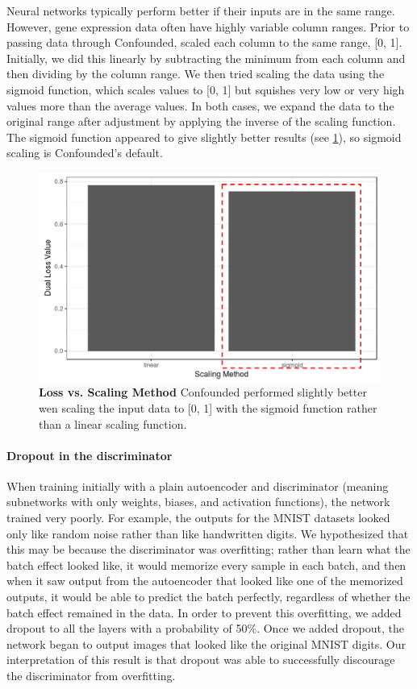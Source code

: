 \documentclass{article}
\begin{document}
Neural networks typically perform better if their inputs are in the same range. %
However, gene expression data often have highly variable column ranges. %
Prior to passing data through Confounded, scaled each column to the same range, [0, 1].
Initially, we did this linearly by subtracting the minimum from each column and then dividing by the column range.
We then tried scaling the data using the sigmoid function, which scales values to [0, 1] but squishes very low or very high values more than the average values.
In both cases, we expand the data to the original range after adjustment by applying the inverse of the scaling function.
The sigmoid function appeared to give slightly better results (see \figurename{} \ref{fig:scaling}), so sigmoid scaling is Confounded's default.

\begin{figure}
	\centering
	\includegraphics[width=\columnwidth]{figures/supplement/scaling.png}
	\caption{\textbf{Loss vs. Scaling Method}
	Confounded performed slightly better wen scaling the input data to [0, 1] with the sigmoid function rather than a linear scaling function.
	}
	\label{fig:scaling}
\end{figure}

\paragraph{Dropout in the discriminator}

When training initially with a plain autoencoder and discriminator (meaning subnetworks with only weights, biases, and activation functions), the network trained very poorly.
For example, the outputs for the MNIST datasets looked only like random noise rather than like handwritten digits.
We hypothesized that this may be because the discriminator was overfitting;
rather than learn what the batch effect looked like, it would memorize every sample in each batch, and then when it saw output from the autoencoder that looked like one of the memorized outputs, it would be able to predict the batch perfectly, regardless of whether the batch effect remained in the data.
In order to prevent this overfitting, we added dropout to all the layers with a probability of 50\%.
Once we added dropout, the network began to output images that looked like the original MNIST digits.
Our interpretation of this result is that dropout was able to successfully discourage the discriminator from overfitting.
\end{document}
